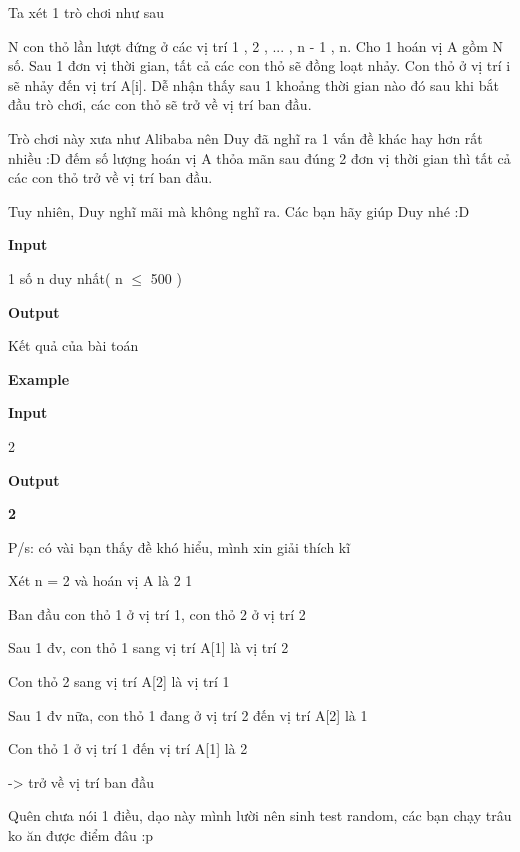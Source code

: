 



    Ta xét 1 trò chơi như sau   

    N con thỏ lần lượt đứng ở các vị trí 1 , 2 , ... , n - 1 , n. Cho 1 hoán vị A gồm N số. Sau 1 đơn vị thời gian, tất cả các con thỏ sẽ đồng loạt nhảy. Con thỏ ở vị trí i sẽ nhảy đến vị trí A[i]. Dễ nhận thấy sau 1 khoảng thời gian nào đó sau khi bắt đầu trò chơi, các con thỏ sẽ trở về vị trí ban đầu.   

    Trò chơi này xưa như Alibaba nên Duy đã nghĩ ra 1 vấn đề khác hay hơn rất nhiều :D đếm số lượng hoán vị A thỏa mãn sau đúng 2 đơn vị thời gian thì tất cả các con thỏ trở về vị trí ban đầu.   

    Tuy nhiên, Duy nghĩ mãi mà không nghĩ ra. Các bạn hãy giúp Duy nhé :D    









\textbf{     Input    }

    1 số n duy nhất( n  $\le$  500 )    




\textbf{     Output    }

    Kết quả của bài toán   






\textbf{     Example    }

\textbf{     Input    }

    2   

\textbf{     Output    }

\textbf{     2    }



    P/s: có vài bạn thấy đề khó hiểu, mình xin giải thích kĩ   

    Xét n = 2 và hoán vị A là 2 1   

    Ban đầu con thỏ 1 ở vị trí 1, con thỏ 2 ở vị trí 2   

    Sau 1 đv, con thỏ 1 sang vị trí A[1] là vị trí 2   

    Con thỏ 2 sang vị trí A[2] là vị trí 1   

    Sau 1 đv nữa, con thỏ 1 đang ở vị trí 2 đến vị trí A[2] là 1   

    Con thỏ 1 ở vị trí 1 đến vị trí A[1] là 2   

    -> trở về vị trí ban đầu   

    Quên chưa nói 1 điều, dạo này mình lười nên sinh test random, các bạn chạy trâu ko ăn được điểm đâu :p    



